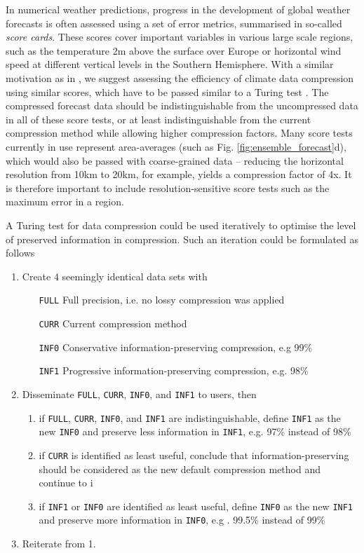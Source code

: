 In numerical weather predictions, progress in the development of global weather forecasts is often assessed using a set of error metrics,
summarised in so-called \emph{score cards}. These scores cover important variables in various large scale regions, such as the temperature
2m above the surface over Europe or horizontal wind speed at different vertical levels in the Southern Hemisphere. With a similar motivation
as in \cite{Baker2019}, we suggest assessing the efficiency of climate data compression using similar scores, which have to be passed similar
to a Turing test \citep{Baker2016,Turing1950}. The compressed forecast data should be indistinguishable from the uncompressed data in all
of these score tests, or at least indistinguishable from the current compression method while allowing higher compression factors.  Many score
tests currently in use represent area-averages (such as Fig. \ref{fig:ensemble_forecast}d), which would also be passed with coarse-grained data
-- reducing the horizontal resolution from 10km to 20km, for example, yields a compression factor of 4x. It is therefore
important to include resolution-sensitive score tests such as the maximum error in a region. 

A Turing test for data compression could be used iteratively to optimise the level of preserved information in compression. Such an iteration could be 
formulated as follows

\begin{enumerate}
	\item Create 4 seemingly identical data sets with
		\begin{itemize} 
			\item[\texttt{FULL}] Full precision, i.e. no lossy compression was applied
			\item[\texttt{CURR}] Current compression method
			\item[\texttt{INF0}] Conservative information-preserving compression, e.g 99\%
			\item[\texttt{INF1}] Progressive information-preserving compression, e.g. 98\%
		\end{itemize}
	\item Disseminate \texttt{FULL}, \texttt{CURR}, \texttt{INF0}, and \texttt{INF1}  to users, then
		\begin{enumerate}[i]
			\item if \texttt{FULL}, \texttt{CURR}, \texttt{INF0}, and \texttt{INF1} are indistinguishable,
			define \texttt{INF1} as the new \texttt{INF0} and preserve less information in \texttt{INF1}, e.g. 97\% instead of 98\%
			\item if \texttt{CURR} is identified as least useful, conclude that information-preserving should be considered as
			the new default compression method and continue to i
			\item if \texttt{INF1} or \texttt{INF0} are identified as least useful, define \texttt{INF0} as the new \texttt{INF1} and
			preserve more information in \texttt{INF0}, e.g . 99.5\% instead of 99\%
		\end{enumerate}
	\item Reiterate from 1.
\end{enumerate}

